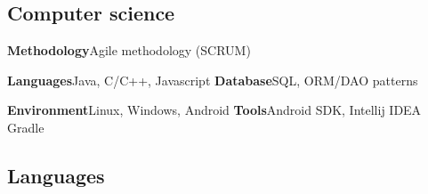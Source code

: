\subsection{Computer science}
\cvitem
	{\textbf{Methodology}}{Agile methodology (SCRUM)}

	
\cvdoubleitem
	{\textbf{Languages}}{Java, C/C++, Javascript}
	{\textbf{Database}}{SQL, ORM/DAO patterns}

\cvdoubleitem
	{\textbf{Environment}}{Linux, Windows, Android}
	{\textbf{Tools}}{Android SDK, Intellij IDEA\\ Gradle}
	
\vspace*{-0.3cm}
\subsection{Languages}
